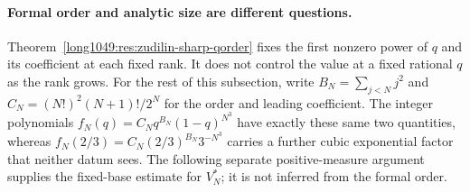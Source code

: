 \documentclass[11pt]{article}
\begin{document}
\paragraph{Formal order and analytic size are different questions.}
Theorem~\ref{long1049:res:zudilin-sharp-qorder} fixes the first nonzero power of $q$ and
its coefficient at each fixed rank.  It does not control the value at a fixed
rational $q$ as the rank grows.  For the rest of this subsection, write $B_N=\sum_{j<N}j^2$ and
$C_N=(N!)^2(N+1)!/2^N$ for the order and leading coefficient.
The integer polynomials $f_N(q)=C_Nq^{B_N}(1-q)^{N^3}$ have exactly
these same two quantities, whereas $f_N(2/3)=C_N(2/3)^{B_N}3^{-N^{3}}$ carries a further
cubic exponential factor that neither datum sees.  The following separate
positive-measure argument supplies the fixed-base estimate for $V_N^*$;
it is not inferred from the formal order.
\end{document}
